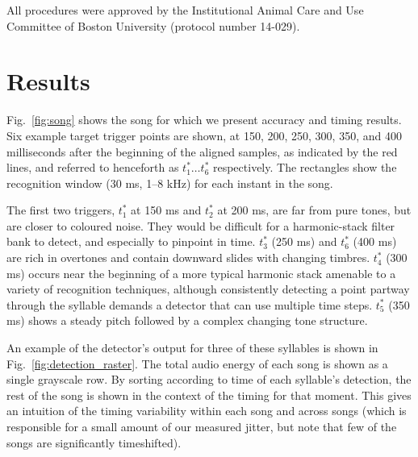 \documentclass[10pt,letterpaper]{article}
\newcommand\fig[1]{Fig.~\ref{#1}}
\begin{document}
All procedures were approved by the Institutional Animal Care and Use
Committee of Boston University (protocol number 14-029).

\section{Results}
\label{sec:results}

\fig{fig:song} shows the song for which we present accuracy and timing
results.  Six example target trigger points are shown, at 150, 200,
250, 300, 350, and 400 milliseconds after the beginning of the aligned
samples, as indicated by the red lines, and referred to henceforth as
$t^*_1\ldots t^*_6$ respectively.  The rectangles show the recognition
window (30 ms, 1--8 kHz) for each instant in the song.

The first two triggers, $t^*_1$ at 150 ms and $t^*_2$ at 200 ms, are
far from pure tones, but are closer to coloured noise.  They would be
difficult for a harmonic-stack filter bank to detect, and especially
to pinpoint in time.  $t^*_3$ (250 ms) and $t^*_6$ (400 ms) are rich
in overtones and contain downward slides with changing timbres.
$t^*_4$ (300 ms) occurs near the beginning of a more typical harmonic
stack amenable to a variety of recognition techniques, although
consistently detecting a point partway through the syllable demands a
detector that can use multiple time steps.  $t^*_5$ (350 ms) shows a
steady pitch followed by a complex changing tone structure.

An example of the detector's output for three of these syllables is
shown in \fig{fig:detection_raster}.  The total audio energy of each
song is shown as a single grayscale row.  By sorting according to time
of each syllable's detection, the rest of the song is shown in the
context of the timing for that moment.  This gives an intuition of the
timing variability within each song and across songs (which is
responsible for a small amount of our measured jitter, but note that few of the songs are significantly timeshifted).
\end{document}
